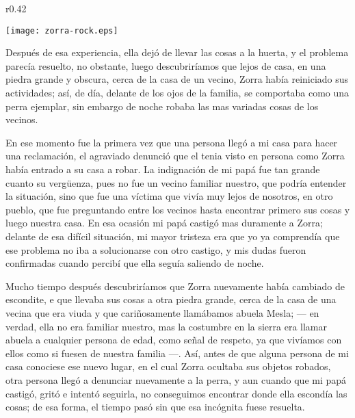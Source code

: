 \begin{wrapfigure}{r}{0.42\textwidth}
  \begin{center}
  \vspace{-10pt}
    \texttt{[image: zorra-rock.eps]}
  \end{center}
  \vspace{-20pt}
\end{wrapfigure}
Después de esa experiencia, ella dejó de llevar las cosas a la huerta, y el problema parecía resuelto, no obstante, luego descubriríamos que lejos de casa, en una piedra grande y obscura, cerca de la casa de un vecino, Zorra había reiniciado sus actividades; así, de día, delante de los ojos de la familia, se comportaba como una perra ejemplar, sin embargo de noche robaba las mas variadas cosas de los vecinos.

En ese momento fue la primera vez que una persona llegó a mi casa para hacer una reclamación, el agraviado denunció que el tenia visto en persona como Zorra había entrado a su casa a robar.
La indignación de mi papá fue tan grande cuanto su vergüenza, pues no fue un vecino familiar nuestro, que podría entender la situación, sino que fue una víctima que vivía muy lejos de nosotros, en otro pueblo, que fue preguntando entre los vecinos hasta encontrar primero sus cosas y luego nuestra casa.
En esa ocasión mi papá castigó mas duramente a Zorra; delante de esa difícil situación, mi mayor tristeza era que yo ya comprendía que ese problema no iba a solucionarse con otro castigo, y mis dudas fueron confirmadas cuando percibí que ella seguía saliendo de noche.

Mucho tiempo después descubriríamos que Zorra nuevamente había cambiado de escondite, e que llevaba sus cosas a otra piedra grande, cerca de la casa de una vecina que era viuda y que cariñosamente llamábamos abuela Mesla; --- en verdad, ella no era familiar nuestro, mas la costumbre en la sierra era llamar abuela a cualquier persona de edad, como señal de respeto, ya que vivíamos con ellos como si fuesen de nuestra familia ---.
Así, antes de que alguna persona de mi casa conociese ese nuevo lugar, en el cual Zorra ocultaba sus objetos robados, otra persona llegó a denunciar nuevamente a la perra, y aun cuando que mi papá castigó, gritó e intentó seguirla, no conseguimos encontrar donde ella escondía las cosas; de esa forma, el tiempo pasó sin que esa incógnita fuese resuelta.

